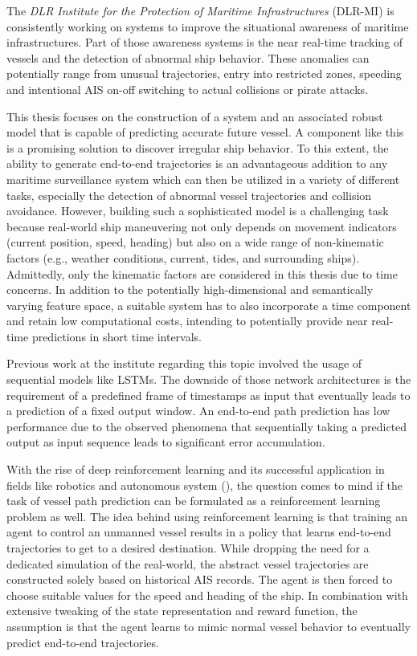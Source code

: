 The \textit{DLR Institute for the Protection of Maritime Infrastructures} (DLR-MI) is consistently working on systems to improve the situational awareness of maritime infrastructures. Part of those awareness systems is the near real-time tracking of vessels and the detection of abnormal ship behavior. These anomalies can potentially range from unusual trajectories, entry into restricted zones, speeding and intentional AIS on-off switching to actual collisions or pirate attacks.
\par
This thesis focuses on the construction of a system and an associated robust model that is capable of predicting accurate future vessel. A component like this is a promising solution to discover irregular ship behavior. To this extent, the ability to generate end-to-end trajectories is an advantageous addition to any maritime surveillance system which can then be utilized in a variety of different tasks, especially the detection of abnormal vessel trajectories and collision avoidance.
However, building such a sophisticated model is a challenging task because real-world ship maneuvering not only depends on movement indicators (current position, speed, heading) but also on a wide range of non-kinematic factors (e.g., weather conditions, current, tides, and surrounding ships). Admittedly, only the kinematic factors are considered in this thesis due to time concerns. In addition to the potentially high-dimensional and semantically varying feature space, a suitable system has to also incorporate a time component and retain low computational costs, intending to potentially provide near real-time predictions in short time intervals.
\par
Previous work at the institute regarding this topic involved the usage of sequential models like LSTMs. The downside of those network architectures is the requirement of a predefined frame of timestamps as input that eventually leads to a prediction of a fixed output window. An end-to-end path prediction has low performance due to the observed phenomena that sequentially taking a predicted output as input sequence leads to significant error accumulation.
\par
With the rise of deep reinforcement learning and its successful application in fields like robotics and autonomous system (\cite{s18092905, zare2021continuous, 9195789, martinsen2018curved}), the question comes to mind if the task of vessel path prediction can be formulated as a reinforcement learning problem as well. The idea behind using reinforcement learning is that training an agent to control an unmanned vessel results in a policy that learns end-to-end trajectories to get to a desired destination. While dropping the need for a dedicated simulation of the real-world, the abstract vessel trajectories are constructed solely based on historical AIS records. The agent is then forced to choose suitable values for the speed and heading of the ship. In combination with extensive tweaking of the state representation and reward function, the assumption is that the agent learns to mimic normal vessel behavior to eventually predict end-to-end trajectories.
